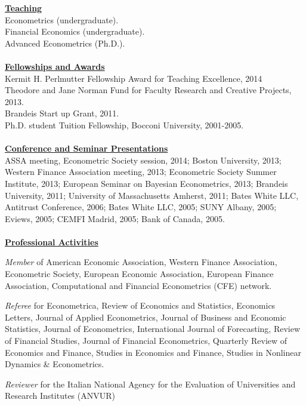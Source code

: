 \documentclass[12pt]{article}
\begin{document}
\begin{itemize}
	\end{itemize}


\underline{\textbf{Teaching}}\\
Econometrics (undergraduate).\\
Financial Economics (undergraduate). \\
Advanced Econometrics (Ph.D.). \\ \\
\underline{\textbf{Fellowships and Awards}}\\
Kermit H. Perlmutter Fellowship Award for Teaching Excellence, 2014 \\
Theodore and Jane Norman Fund for Faculty Research and Creative Projects, 2013. \\
Brandeis Start up Grant, 2011. \\
Ph.D. student Tuition Fellowship, Bocconi University, 2001-2005.\\ \\
\underline{\textbf{Conference and Seminar Presentations}}\\
ASSA meeting, Econometric Society session, 2014; Boston University, 2013; Western Finance Association meeting, 2013; Econometric Society Summer Institute, 2013; European Seminar on Bayesian Econometrics, 2013; Brandeis University, 2011; University of Massachusetts Amherst, 2011; Bates White LLC, Antitrust Conference, 2006; Bates White LLC, 2005; SUNY Albany, 2005; Eviews, 2005; CEMFI Madrid, 2005; Bank of Canada, 2005.\\ \\
\underline{\textbf{Professional Activities}}
\begin{description}
\item\emph{Member} of American Economic Association, Western Finance Association, Econometric Society, European Economic Association, European Finance Association, Computational and Financial Econometrics (CFE) network.

\item \emph{Referee} for Econometrica, Review of Economics and Statistics, Economics Letters, Journal of Applied Econometrics, Journal of Business and Economic Statistics, Journal of Econometrics, International Journal of Forecasting, Review of Financial Studies, Journal of Financial Econometrics, Quarterly Review of Economics and Finance, Studies in Economics and Finance, Studies in Nonlinear Dynamics & Econometrics.

\item \emph{Reviewer} for the Italian National Agency for the Evaluation of Universities and Research Institutes (ANVUR) 
\end{description}
 
\end{document}
